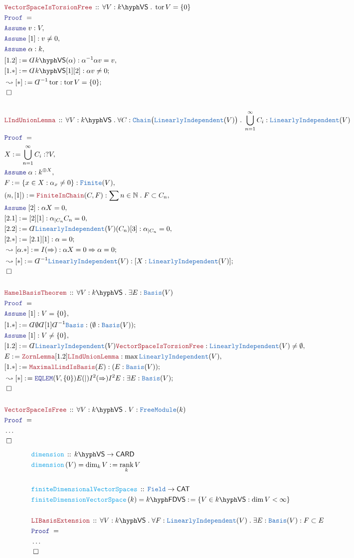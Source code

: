 \documentclass[12pt]{scrartcl}%
\newcommand{\TYPE}[1]{\textcolor{NavyBlue}{\mathtt{#1}}}%
\newcommand{\FUNC}[1]{\textcolor{Cerulean}{\mathtt{#1}}}%
\newcommand{\LOGIC}[1]{\textcolor{Blue}{\mathtt{#1}}}%
\newcommand{\THM}[1]{\textcolor{Maroon}{\mathtt{#1}}}%
\renewcommand{\.}{\; . \;} %
\newcommand{\de}{: \kern 0.1pc =} %
\newcommand{\Act}[1]{\left( #1 \right)} %
\newcommand{\Theorem}[2]{& \THM{#1} \, :: \, #2 \\ & \Proof = \\ } %
\newcommand{\DeclareFunc}[2]{& \FUNC{#1} \, :: \, #2 \\}%
\newcommand{\DefineNamedFunc}[4]{&  \FUNC{#1}\Act{#2} = #3 \de #4 \\}%
\newcommand{\Page}[1]{ \begin{align*} #1 \end{align*}  }%
\newcommand{ \bd }{ \ByDef }%
\newcommand{\NoProof}{ & \ldots \\ \EndProof}%
\newcommand{\Nat}{\mathbb{N}}%
\newcommand{\Say}[3]{& #1 \de #2 : #3, \\} %
\newcommand{\Conclude}[3]{& #1 \de #2 : #3; \\}%
\newcommand{\DeriveConclude}[3]{& \leadsto #1 \de #2 : #3 ; \\} %
\newcommand{\Assume}[2]{& \LOGIC{Assume} \; #1 : #2, \\} %
\newcommand{\QED}{\; \square} %
\newcommand{\EndProof}{& \QED \\} %
\newcommand{\ByDef}{\rotatebox[origin=c]{-180}{$D$}}%
\newcommand{\Proof}{\LOGIC{Proof} \; } %
\newcommand{\CAT}{\mathsf{CAT}} %
\DeclareMathOperator{\tor}{tor} %
\DeclareMathOperator{\rank}{rank} %
\newcommand{\Basis}{\TYPE{Basis}} %
\newcommand{\LI}{\TYPE{LinearlyIndependent}}
\newcommand{\FM}{\TYPE{FreeModule}}
\newcommand{\VS}[1]{#1\hyph\mathsf{VS}} %
\newcommand{\FDVS}[1]{#1\hyph\mathsf{FDVS}} %
\begin{document}
\Page{
	\Theorem{VectorSpaceIsTorsionFree}
	{  \forall V : \VS{k} \. \tor V = \{0\}    }
	\Assume{v}{V}
	\Assume{[1]}{v \neq 0}
	\Assume{\alpha}{k}
	\Say{[1.2]}{\bd \VS{k}(\alpha)}{\alpha^{-1} \alpha v  = v}
	\Conclude{[1.*]}{ \bd \VS{k}[1][2]}{\alpha v \neq 0}
	\DeriveConclude{[*]}{\bd^{-1}\tor}{\tor V = \{0\}}
	\EndProof
	\\
	\Theorem{LIndUnionLemma}{
		\forall V : \VS{k} \. 
		\forall C : \TYPE{Chain}\big( \LI(V) \big) \.
		\bigcup^\infty_{n=1} C_i : \LI(V)
	}
	\Say{X}{\bigcup^\infty_{n=1} C_i}{?V}
	\Assume{\alpha}{k^{\oplus X}}
	\Say{F}{\{ x \in X : \alpha_x \neq 0 \}}{\TYPE{Finite}(V)}
	\Say{(n,[1]) }{ \THM{FiniteInChain}(C,F) }{\sum n \in \Nat \. F \subset C_n}
	\Assume{[2]}{\alpha X = 0}
	\Say{[2.1]}{[2][1]}{\alpha_{|C_n} C_n = 0}
	\Say{[2.2]}{\bd \LI(V)(C_n)[3]}{\alpha_{|C_n} = 0}
	\Conclude{[2.*]}{[2.1][1]}{\alpha = 0}
	\DeriveConclude{[\alpha.*]}{I(\Rightarrow)}{\alpha X = 0 \Rightarrow \alpha = 0}
	\DeriveConclude{[*]}{\bd^{-1}\LI(V)}{[X : \LI(V) ]}
	\EndProof
	\\
	\Theorem{HamelBasisTheorem}
	{
		\forall V : \VS{k} \. \exists E : \TYPE{Basis}(V)
	}
	\Assume{[1]}{V=\{0\}}
	\Conclude{[1.*]}{\bd\emptyset\bd[1]\bd^{-1}\TYPE{Basis}}{(\emptyset : \TYPE{Basis}(V))}
	\Assume{[1]}{V \neq \{0\}}
	\Say{[1.2]}{\bd \LI(V) \THM{VectorSpaceIsTorsionFree}}{\LI(V) \neq \emptyset}
	\Say{E}{\THM{ZornLemma}[1.2]\THM{LIndUnionLemma}}{ \max \LI(V)   }
	\Conclude{[1.*]}{\THM{MaximalLindIsBasis}(E)}{ (E : \TYPE{Basis}(V))  }
	\DeriveConclude{[*]}{\LOGIC{EQLEM}(V,\{0\})E(|)I^2(\Rightarrow)I^2 E}{\exists E : \TYPE{Basis}(V)}
	\EndProof
	\\
	\Theorem{VectorSpaceIsFree}{\forall V : \VS{k} \. V : \FM(k)}
	\NoProof
}\Page{
	\DeclareFunc{dimension}{\VS{k} \to \mathsf{CARD}}
	\DefineNamedFunc{dimension}{V}{\dim_k V}{\rank_k V}
	\\
	\DeclareFunc{finiteDimensionalVectorSpaces}{\TYPE{Field} \to \CAT}
	\DefineNamedFunc{finiteDimensionVectorSpace}{k}{\FDVS{k}}{\{V \in \VS{k} : \dim V < \infty \} }
	\\
	\Theorem{LIBasisExtension}{\forall V : \VS{k} \. \forall F : \LI(V) \. \exists E : \Basis(V) : F \subset E}
	\NoProof
}
\newpage
\end{document}
